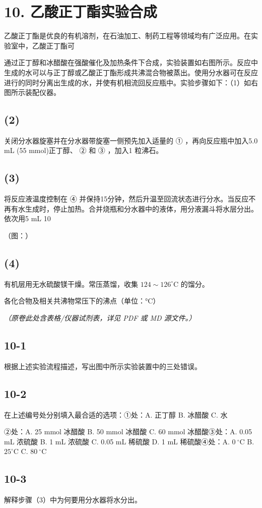 \section*{10. 乙酸正丁酯实验合成}
⼄酸正丁酯是优良的有机溶剂，在⽯油加⼯、制药⼯程等领域均有⼴泛应⽤。在实验室中，⼄酸正丁酯可

通过正丁醇和冰醋酸在强酸催化及加热条件下合成，实验装置如右图所⽰。反应中⽣成的⽔可以与正丁醇或⼄酸正丁酯形成共沸混合物被蒸出。使⽤分⽔器可在反应进⾏的同时分离出⽣成的⽔，并使有机相流回反应瓶中。实验步骤如下：（1）如右图所⽰装配仪器。

\subsection*{(2)}
关闭分⽔器旋塞并在分⽔器带旋塞⼀侧预先加⼊适量的 ① ，再向反应瓶中加⼊5.0 mL (55 mmol)正丁醇、 ② 和 ③ ，加⼊1 粒沸⽯。

\subsection*{(3)}
将反应液温度控制在 ④ 并保持15分钟，然后升温⾄回流状态进⾏分⽔。当反应不再有⽔⽣成时，停⽌加热。合并烧瓶和分⽔器中的液体，⽤分液漏⽃将⽔层分出。依次⽤5 mL 10%

（图：）

\subsection*{(4)}
有机层⽤⽆⽔硫酸镁⼲燥。常压蒸馏，收集 $1 2 4 { \sim } 1 2 6 ^ { \circ } \mathrm { C }$ 的馏分。

各化合物及相关共沸物常压下的沸点（单位：°C）

\textit{（原卷此处含表格/仪器试剂表，详见 PDF 或 MD 源文件。）}

\subsection*{10-1}
根据上述实验流程描述，写出图中所⽰实验装置中的三处错误。

\subsection*{10-2}
在上述编号处分别填⼊最合适的选项：①处：A. 正丁醇 B. 冰醋酸 C. ⽔

②处：A. 25 mmol 冰醋酸 B. 50 mmol 冰醋酸 C. 60 mmol 冰醋酸③处：A. 0.05 mL 浓硫酸 B. 1 mL 浓硫酸 C. 0.05 mL 稀硫酸 D. 1 mL 稀硫酸④处：A. $0 ~ ^ { \circ } \mathrm { C }$ B. $2 5 ^ { \circ } \mathrm { C }$ C. $8 0 ~ ^ { \circ } \mathrm { C }$

\subsection*{10-3}
解释步骤（3）中为何要⽤分⽔器将⽔分出。
